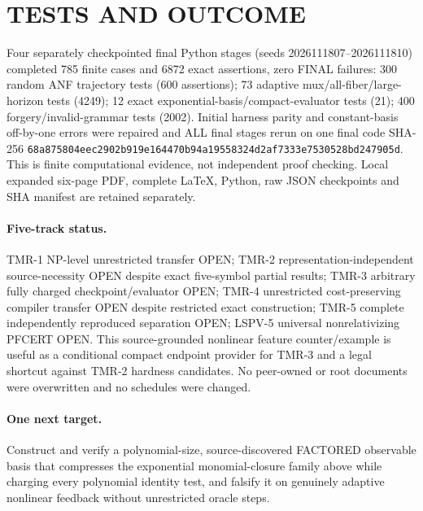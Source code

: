 \documentclass[11pt]{article}
\begin{document}
\section{TESTS AND OUTCOME}
Four separately checkpointed final Python stages (seeds 2026111807--2026111810) completed 785 finite cases and 6872 exact assertions, zero FINAL failures: 300 random ANF trajectory tests (600 assertions); 73 adaptive mux/all-fiber/large-horizon tests (4249); 12 exact exponential-basis/compact-evaluator tests (21); 400 forgery/invalid-grammar tests (2002). Initial harness parity and constant-basis off-by-one errors were repaired and ALL final stages rerun on one final code SHA-256 \texttt{68a875804eec2902b919e164470b94a19558324d2af7333e7530528bd247905d}. This is finite computational evidence, not independent proof checking. Local expanded six-page PDF, complete LaTeX, Python, raw JSON checkpoints and SHA manifest are retained separately.

\paragraph{Five-track status.} TMR-1 NP-level unrestricted transfer OPEN; TMR-2 representation-independent source-necessity OPEN despite exact five-symbol partial results; TMR-3 arbitrary fully charged checkpoint/evaluator OPEN; TMR-4 unrestricted cost-preserving compiler transfer OPEN despite restricted exact construction; TMR-5 complete independently reproduced separation OPEN; LSPV-5 universal nonrelativizing PFCERT OPEN. This source-grounded nonlinear feature counter/example is useful as a conditional compact endpoint provider for TMR-3 and a legal shortcut against TMR-2 hardness candidates. No peer-owned or root documents were overwritten and no schedules were changed.

\paragraph{One next target.} Construct and verify a polynomial-size, source-discovered FACTORED observable basis that compresses the exponential monomial-closure family above while charging every polynomial identity test, and falsify it on genuinely adaptive nonlinear feedback without unrestricted oracle steps.
\end{document}
